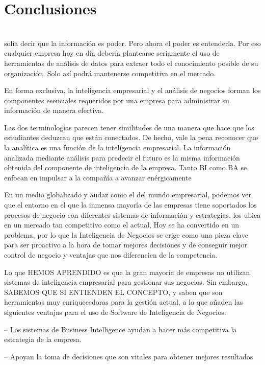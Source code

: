 \section{Conclusiones}
\\
\itemSe solía decir que la información es poder. Pero ahora el poder es entenderla. Por eso cualquier empresa hoy en día debería plantearse seriamente el uso de herramientas de análisis de datos para extraer todo el conocimiento posible de su organización. Solo así podrá mantenerse competitiva en el mercado.
\\
\item En forma exclusiva, la inteligencia empresarial y el análisis de negocios forman los componentes esenciales requeridos por una empresa para administrar su información de manera efectiva.
\\
\item 
Las dos terminologías parecen tener similitudes de una manera que hace que los estudiantes deduzcan que están conectados. De hecho, vale la pena reconocer que la analítica es una función de la inteligencia empresarial. La información analizada mediante análisis para predecir el futuro es la misma información obtenida del componente de inteligencia de la empresa. Tanto BI como BA se enfocan en impulsar a la compañía a avanzar enérgicamente
\\
\item En un medio globalizado y audaz como el del mundo empresarial, podemos ver que el entorno en el que la inmensa mayoría de las empresas tiene soportados los procesos de negocio con diferentes sistemas de información y estrategias, los ubica en un mercado tan competitivo como el actual, Hoy se ha convertido en un problema, por lo que la Inteligencia de Negocios se erige como una pieza clave para ser proactivo a la hora de tomar mejores decisiones y de conseguir mejor control de negocio y ventajas que nos diferencien de la competencia.
\\
\item Lo que HEMOS APRENDIDO es que la gran mayoría de empresas no utilizan sistemas de inteligencia empresarial para gestionar sus negocios. Sin embargo, SABEMOS QUE SI ENTIENDEN EL CONCEPTO, y saben que son herramientas muy enriquecedoras para la gestión actual, a lo que añaden las siguientes ventajas para el  uso de Software de Inteligencia de Negocios:

 – Los sistemas de Business Intelligence ayudan a hacer más competitiva la estrategia de la empresa.

 – Apoyan la toma de decisiones que son vitales para obtener mejores resultados

